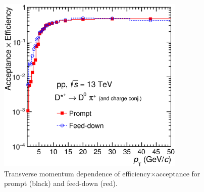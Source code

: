 \begin{figure}[tb]
\begin{center}
 \includegraphics[width=0.8\textwidth]{figures/Dstar/pp13TeV/DstarAccEffVsPt_pp_13TeV.eps}
\caption{Transverse momentum dependence of efficiency$\times$acceptance for prompt (black) and feed-down (red).}
\label{fig:Dstar_eff}
\end{center}
\end{figure}

